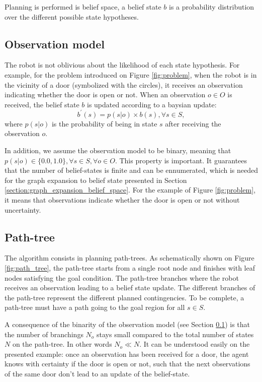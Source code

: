 \documentclass[letterpaper, 10 pt, conference]{ieeeconf}  %
\begin{document}
Planning is performed is belief space, a belief state $b$ is a probability distribution over the different possible state hypotheses.

\subsection{Observation model}
\label{sec:observation_model}
The robot is not oblivious about the likelihood of each state hypothesis. For example, for the problem introduced on Figure \ref{fig:problem}, when the robot is in the vicinity of a door (symbolized with the circles), it receives an observation indicating whether the door is open or not. When an observation $o \in O$ is received, the belief state $b$ is updated according to a baysian update:
\begin{equation}
\label{eq:baysian}
b^\prime(s) = p(s | o) \times b(s), \forall s \in S,
\end{equation}
where $p(s | o)$ is the probability of being in state $s$ after receiving the observation $o$. 

In addition, we assume the observation model to be binary, meaning that $p(s | o) \in \{0.0, 1.0\}, \forall s \in S, \forall o \in O$. This property is important. It guarantees that the number of belief-states is finite and can be ennumerated, which is needed for the graph expansion to belief state presented in Section \ref{section:graph_expansion_belief_space}. For the example of Figure \ref{fig:problem}, it means that observations indicate whether the door is open or not without uncertainty.

\subsection{Path-tree}
The algorithm consists in planning path-trees. As schematically shown on Figure \ref{fig:path_tree}, the path-tree starts from a single root node and finishes with leaf nodes satisfying the goal condition. The path-tree branches where the robot receives an observation leading to a belief state update. The different branches of the path-tree represent the different planned contingencies. To be complete, a path-tree must have a path going to the goal region for all $s \in S$.

A consequence of the binarity of the observation model (see Section \ref{sec:observation_model}) is that the number of branchings $N_o$ stays small compared to the total number of states $N$ on the path-tree. In other words $N_o \ll N$. It can be understood easily on the presented example: once an observation has been received for a door, the agent knows with certainty if the door is open or not, such that the next observations of the same door don't lead to an update of the belief-state.
\end{document}
